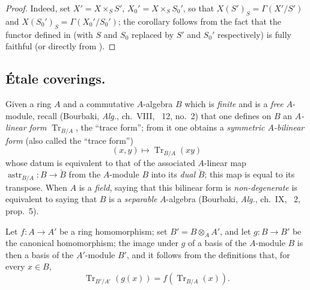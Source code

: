 \begin{proof}
Indeed, set $X'=X\times_S S'$, $X_0'=X\times_S S_0'$, so that $X(S')_S=\Gamma(X'/S')$ and $X(S_0')_S=\Gamma(X_0'/S_0')$;
the corollary follows from the fact that the functor defined in  (with $S$ and $S_0$ replaced by $S'$ and $S_0'$ respectively) is fully faithful (or directly from ).
\end{proof}

\subsection{\'Etale coverings.}
\label{subsection:IV.18.2}


\begin{env}[18.2.1]
\label{IV.18.2.1}
Given a ring $A$ and a commutative $A$-algebra $B$ which is \emph{finite} and is a \emph{free} $A$-module, recall (Bourbaki, \emph{Alg.}, ch.~VIII, \textsection~12, no.~2) that one defines on $B$ an \emph{$A$-linear form} $\operatorname{Tr}_{B/A}$, the ``trace form''; from it one obtains a \emph{symmetric $A$-bilinear form} (also called the ``trace form'')
\[
\label{IV.18.2.1.1}
(x,y)\mapsto\operatorname{Tr}_{B/A}(xy)
\tag{18.2.1.1}
\]
whose datum is equivalent to that of the associated $A$-linear map $\operatorname{astr}_{B/A}:B\to\check{B}$ from the $A$-module $B$ into its \emph{dual} $\check{B}$; this map is equal to its transpose.  When $A$ is a \emph{field}, saying that this bilinear form is \emph{non-degenerate} is equivalent to saying that $B$ is a \emph{separable} $A$-algebra (Bourbaki, \emph{Alg.}, ch.~IX, \textsection~2, prop.~5).

Let $f:A\to A'$ be a ring homomorphism;
set $B'=B\otimes_A A'$, and let $g:B\to B'$ be the canonical homomorphism;
the image under $g$ of a basis of the $A$-module $B$ is then a basis of the $A'$-module $B'$, and it follows from the definitions that, for every $x\in B$,
\[
\label{IV.18.2.1.2}
\operatorname{Tr}_{B'/A'}(g(x))=f(\operatorname{Tr}_{B/A}(x)).
\tag{18.2.1.2}
\]
\end{env}


